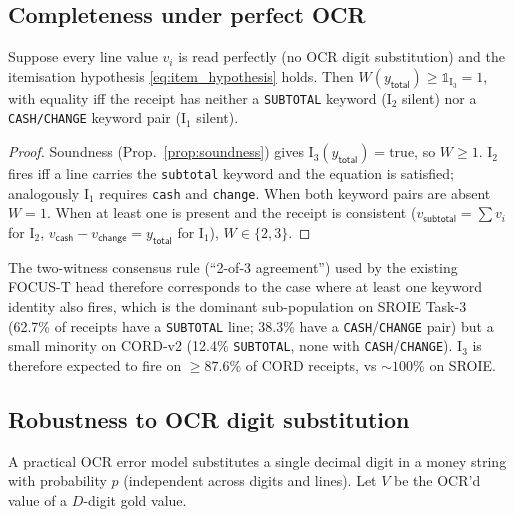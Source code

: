 \subsection{Completeness under perfect OCR}
\label{sec:focus_sigma_complete}

\begin{proposition}
\label{prop:complete}
Suppose every line value $v_i$ is read perfectly (no OCR digit
substitution) and the itemisation hypothesis
\eqref{eq:item_hypothesis} holds.  Then
$W(y_{\textsf{total}}) \ge \mathds{1}_{\mathrm{I}_3} = 1$, with
equality iff the receipt has neither a \texttt{SUBTOTAL} keyword
($\mathrm{I}_2$ silent) nor a \texttt{CASH/CHANGE} keyword pair
($\mathrm{I}_1$ silent).
\end{proposition}

\begin{proof}
Soundness (Prop.~\ref{prop:soundness}) gives
$\mathrm{I}_3(y_{\textsf{total}})=\mathrm{true}$, so $W \ge 1$.
$\mathrm{I}_2$ fires iff a line carries the \texttt{subtotal} keyword
and the equation is satisfied; analogously $\mathrm{I}_1$ requires
\texttt{cash} and \texttt{change}.  When both keyword pairs are absent
$W = 1$.  When at least one is present and the receipt is consistent
($v_{\textsf{subtotal}} = \sum v_i$ for $\mathrm{I}_2$, $v_{\textsf{cash}}-
v_{\textsf{change}}=y_{\textsf{total}}$ for $\mathrm{I}_1$),
$W \in \{2,3\}$.
\end{proof}

\noindent
The two-witness consensus rule (``2-of-3 agreement'') used by the
existing FOCUS-T head therefore corresponds to the case where at
least one keyword identity also fires, which is the dominant
sub-population on SROIE Task-3 (62.7\% of receipts have a
\texttt{SUBTOTAL} line; 38.3\% have a \texttt{CASH}/\texttt{CHANGE}
pair) but a small minority on CORD-v2 (12.4\% \texttt{SUBTOTAL},
none with \texttt{CASH}/\texttt{CHANGE}).  $\mathrm{I}_3$ is therefore
expected to fire on $\ge 87.6\%$ of CORD receipts, vs $\sim 100\%$
on SROIE.

\subsection{Robustness to OCR digit substitution}
\label{sec:focus_sigma_robust}

A practical OCR error model substitutes a single decimal digit in a
money string with probability $p$ (independent across digits and
lines).  Let $V$ be the OCR'd value of a $D$-digit gold value.

